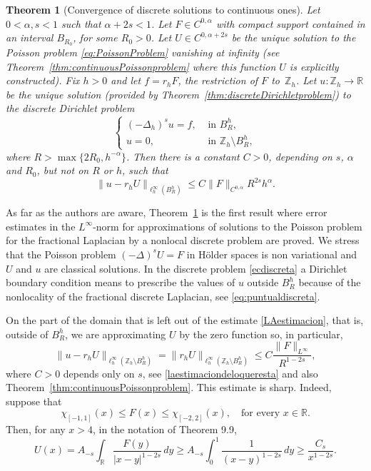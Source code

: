 \documentclass[a4paper,11pt,reqno]{amsart}
\newcommand{\R}{\mathbb{R}}
\newcommand{\Z}{\mathbb{Z}}
\newtheorem{thm}{Theorem}[section]
\theoremstyle{definition}
\numberwithin{equation}{section}
\begin{document}
\begin{thm}[Convergence of discrete solutions to continuous ones]
\label{thm:Convergence-result}
Let $0<\alpha,s<1$ such that $\alpha+2s<1$.
Let $F\in C^{0,\alpha}$ with compact support contained in an interval $B_{R_0}$, for some $R_0>0$.
Let $U\in C^{0,\alpha+2s}$ be the unique solution
to the Poisson problem \eqref{eq:PoissonProblem}
vanishing at infinity (see Theorem~\ref{thm:continuousPoissonproblem}
where this function $U$ is explicitly constructed).
Fix $h>0$ and let $f=r_hF$, the restriction of $F$ to~$\Z_h$. Let $u:\Z_h\to\R$ be
the unique solution (provided by Theorem~\ref{thm:discreteDirichletproblem}) to the discrete Dirichlet problem
\begin{equation}
\label{ecdiscreta}
\begin{cases}
(-\Delta_h)^su=f, & \text{ in } B_R^h, \\
u=0, & \text{ in } \Z_h\setminus B_R^h,
\end{cases}
\end{equation}
where $R>\max\{2R_0,h^{-\alpha}\}$. Then there is a constant $C>0$,
depending on $s$, $\alpha$ and $R_0$, but not on $R$ or $h$, such that
\begin{equation}
\label{LAestimacion}
\|u-r_hU\|_{\ell^\infty_h(B_R^h)}\leq C\|F\|_{C^{0,\alpha}}R^{2s}h^{\alpha}.
\end{equation}
\end{thm}

As far as the authors are aware, Theorem~\ref{thm:Convergence-result} is the first result where
error estimates in the $L^\infty$-norm for approximations of solutions to the Poisson problem
for the fractional Laplacian by a nonlocal discrete problem are proved.
We stress that the Poisson problem $(-\Delta)^sU=F$ in H\"older spaces is non variational
and $U$ and $u$ are classical solutions.
In the discrete problem \eqref{ecdiscreta} a Dirichlet boundary condition
means to prescribe the values of $u$ outside $B_R^h$ because
of the nonlocality of the fractional discrete Laplacian, see \eqref{eq:puntualdiscreta}.

On the part of the domain that is left out of the estimate \eqref{LAestimacion},
that is, outside of $B_R^h$, we are approximating $U$ by the zero function so,
in particular,
$$
\|u-r_hU\|_{\ell^\infty_h(\Z_h\setminus B_R^h)}=\|r_hU\|_{\ell^\infty_h(\Z_h\setminus B_R^h)}
\leq C\frac{\|F\|_{L^\infty}}{R^{1-2s}},
$$
where $C>0$ depends only on $s$, see \eqref{laestimaciondeloqueresta} and
also Theorem~\ref{thm:continuousPoissonproblem}. This estimate
is sharp. Indeed, suppose that
$$
\chi_{[-1,1]}(x)\leq F(x)\leq\chi_{[-2,2]}(x),\quad\text{for every } x\in\R.
$$
Then, for any $x>4$, in the notation of Theorem 9.9,
$$
U(x) = A_{-s}\int_{\R}\frac{F(y)}{|x-y|^{1-2s}}\,dy
\geq A_{-s}\int_{0}^1\frac{1}{(x-y)^{1-2s}}\,dy\geq \frac{C_s}{x^{1-2s}}.
$$
\end{document}
